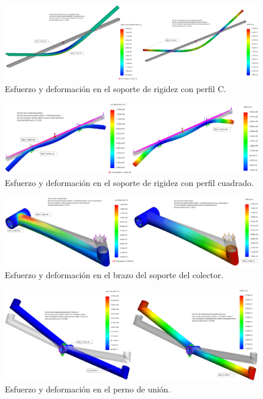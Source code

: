 \begin{figure}[H]
	\centering
	\includegraphics[width=\columnwidth]{imagenes/val_col2}
	\caption{Esfuerzo y deformación en el soporte de rigidez con perfil C.}
	\label{fig:val_col2}
\end{figure}

\begin{figure}[H]
	\centering
	\includegraphics[width=\columnwidth]{imagenes/val_col3}
	\caption{Esfuerzo y deformación en el soporte de rigidez con perfil cuadrado.}
	\label{fig:val_col3}
\end{figure}

\begin{figure}[H]
	\centering
	\includegraphics[width=\columnwidth]{imagenes/val_col4}
	\caption{Esfuerzo y deformación en el brazo del soporte del colector.}
	\label{fig:val_col4}
\end{figure}

\begin{figure}[H]
	\centering
	\includegraphics[width=\columnwidth]{imagenes/val_col5}
	\caption{Esfuerzo y deformación en el perno de unión.}
	\label{fig:val_col5}
\end{figure}

